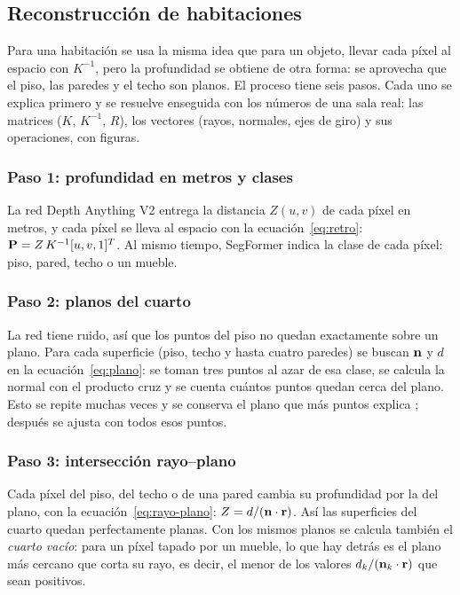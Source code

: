 \subsection{Reconstrucción de habitaciones}

Para una habitación se usa la misma idea que para un objeto, llevar cada píxel
al espacio con $K^{-1}$, pero la profundidad se obtiene de otra forma: se
aprovecha que el piso, las paredes y el techo son planos. El proceso tiene seis
pasos. Cada uno se explica primero y se resuelve enseguida con los números de una sala real: las matrices
($K$, $K^{-1}$, $R$), los vectores (rayos, normales, ejes de giro) y sus operaciones, con figuras.




\subsubsection{Paso 1: profundidad en metros y clases}

La red Depth Anything V2
entrega la distancia $Z(u,v)$ de cada píxel en metros, y cada píxel se lleva al
espacio con la ecuación~\eqref{eq:retro}: $\mathbf{P}=Z\,K^{-1}[u,v,1]^{T}$. Al
mismo tiempo, SegFormer indica la clase de cada píxel: piso, pared, techo o un
mueble.




\subsubsection{Paso 2: planos del cuarto}

La red tiene ruido, así que los puntos
del piso no quedan exactamente sobre un plano. Para cada superficie (piso,
techo y hasta cuatro paredes) se buscan $\mathbf{n}$ y $d$ en la
ecuación~\eqref{eq:plano}: se toman tres puntos al azar de esa clase, se
calcula la normal con el producto cruz y se cuenta cuántos puntos quedan cerca
del plano. Esto se repite muchas veces y se conserva el plano que más puntos
explica \citep{fischler1981}; después se ajusta con todos esos puntos.




\subsubsection{Paso 3: intersección rayo--plano}

Cada píxel del piso, del techo o
de una pared cambia su profundidad por la del plano, con la
ecuación~\eqref{eq:rayo-plano}: $Z=d/(\mathbf{n}\cdot\mathbf{r})$. Así las
superficies del cuarto quedan perfectamente planas. Con los mismos planos se
calcula también el \emph{cuarto vacío}: para un píxel tapado por un mueble, lo
que hay detrás es el plano más cercano que corta su rayo, es decir, el menor de
los valores $d_k/(\mathbf{n}_k\cdot\mathbf{r})$ que sean positivos.


